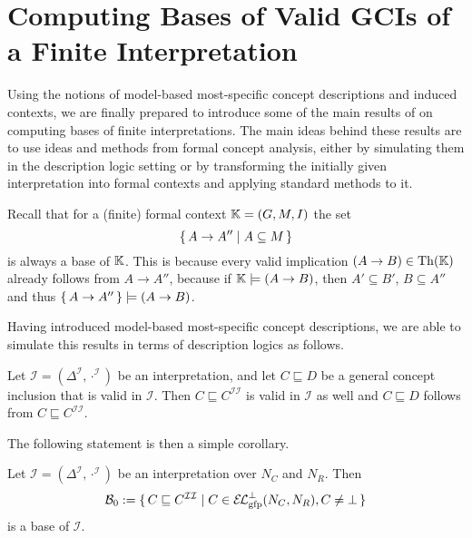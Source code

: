 \section{Computing Bases of Valid GCIs of a Finite Interpretation}
\label{sec:base-all-valid}


Using the notions of model-based most-specific concept descriptions and induced contexts,
we are finally prepared to introduce some of the main results of \textcite{Diss-Felix} on
computing bases of finite interpretations.  The main ideas behind these results are to use
ideas and methods from formal concept analysis, either by simulating them in the
description logic setting or by transforming the initially given interpretation into
formal contexts and applying standard methods to it.

Recall that for a (finite) formal context ${\mathbb{K}} = (G, M, I)$ the set
\begin{equation*}
  {\ensuremath{\{\, A \to A'' \mid A \subseteq M \,\}}}
\end{equation*}
is always a base of ${\mathbb{K}}$.  This is because every valid implication $(A \to B) \in
\operatorname{Th}({\mathbb{K}})$ already follows from $A \to A''$, because if ${\mathbb{K}} \models (A \to B)$, then
$A' \subseteq B'$, \ie $B \subseteq A''$ and thus ${\{\, A \to A ''\,\}} \models (A \to B)$.

Having introduced model-based most-specific concept descriptions, we are able to simulate
this results in terms of description logics as follows.
\begin{Lemma}
  \label{lem:simple-entailment-with-mmsc}
  Let $\mathcal{I} = (\Delta^{\mathcal{I}}, \cdot^{\mathcal{I}})$ be an interpretation,
  and let $C \sqsubseteq D$ be a general concept inclusion that is valid in $\mathcal{I}$.
  Then $C \sqsubseteq C^{\mathcal{I}\mathcal{I}}$ is valid in $\mathcal{I}$ as well and $C
  \sqsubseteq D$ follows from $C \sqsubseteq C^{\mathcal{I}\mathcal{I}}$.
\end{Lemma}

The following statement is then a simple corollary.

\begin{Corollary}
  \label{cor:Felix-base-B0}
  Let $\mathcal{I} = (\Delta^{\mathcal{I}}, \cdot^{\mathcal{I}})$ be an interpretation
  over $N_C$ and $N_R$.  Then
  \begin{equation}
    \label{eq:20}
    \mathcal{B}_0 := {\{\, C \sqsubseteq C^{\mathcal{I}\mathcal{I}} \mid C \in
      {\ensuremath{{\mathcal{E}\kern-.3ex\mathcal{L}}_\text{gfp}^\bot}}(N_C, N_R), C \neq \bot \,\}}
  \end{equation}
  is a base of $\mathcal{I}$.
\end{Corollary}

